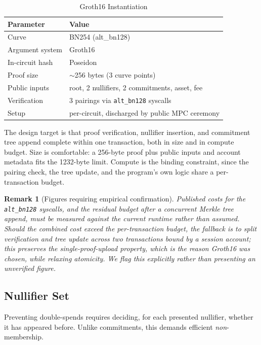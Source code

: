 \documentclass[11pt,a4paper]{article}
\newtheorem{remark}[theorem]{Remark}
\begin{document}
\begin{table}[H]
\centering
\caption{Groth16 Instantiation}
\begin{tabular}{@{}ll@{}}
\toprule
\textbf{Parameter} & \textbf{Value} \\ \midrule
Curve & BN254 (alt\_bn128) \\
Argument system & Groth16 \cite{Groth2016} \\
In-circuit hash & Poseidon \cite{Grassi2021} \\
Proof size & $\sim$256 bytes (3 curve points) \\
Public inputs & root, 2 nullifiers, 2 commitments, asset, fee \\
Verification & 3 pairings via \texttt{alt\_bn128} syscalls \\
Setup & per-circuit, discharged by public MPC ceremony \\ \bottomrule
\end{tabular}
\end{table}

The design target is that proof verification, nullifier insertion, and commitment tree append complete within one transaction, both in size and in compute budget. Size is comfortable: a 256-byte proof plus public inputs and account metadata fits the 1232-byte limit. Compute is the binding constraint, since the pairing check, the tree update, and the program's own logic share a per-transaction budget.

\begin{remark}[Figures requiring empirical confirmation]
Published costs for the \texttt{alt\_bn128} syscalls, and the residual budget after a concurrent Merkle tree append, must be measured against the current runtime rather than assumed. Should the combined cost exceed the per-transaction budget, the fallback is to split verification and tree update across two transactions bound by a session account; this preserves the single-proof-upload property, which is the reason Groth16 was chosen, while relaxing atomicity. We flag this explicitly rather than presenting an unverified figure.
\end{remark}

\subsection{Nullifier Set}

Preventing double-spends requires deciding, for each presented nullifier, whether it has appeared before. Unlike commitments, this demands efficient \emph{non}-membership.
\end{document}
